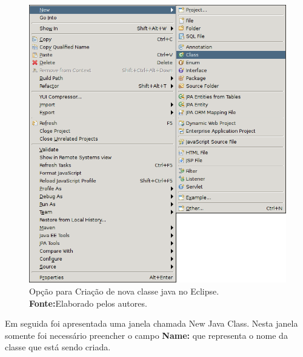 	\begin{figure}[h!]
		\centerline{\includegraphics[scale=0.8]{./imagens/2_q_metodologico/4_procedimentos_resultados/43_webservice/432_desenvolvimento/desws9.png}}
		\caption[Opção para Criação de nova classe java no Eclipse]{Opção para
		Criação de nova classe java no Eclipse.
			\textbf{Fonte:}Elaborado pelos autores.}
		\label{fig:desws9}
	\end{figure}
	
	\pagebreak


	\par Em seguida foi apresentada uma janela chamada New Java Class. Nesta
janela somente foi necessário preencher o campo \textbf{Name:} que representa o
nome da classe que está sendo criada.
	
	
	

